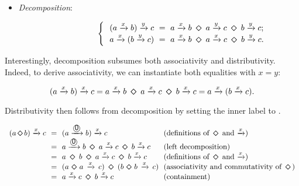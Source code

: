 \documentclass[crc,english]{programming}
\newcommand{\zero}{\raisebox{-0.2mm}{\textcircled{\textsf{0}}}\xspace}
\newcommand{\dia}{\,\text{\raisebox{-0.3mm}{\Large $\diamond$}}\,}
\begin{document}
\vspace{5mm}
\begin{itemize}
    \item \emph{Decomposition}:

          \vspace{-16.3mm}\begin{equation*}
            \hspace{22.5mm}\begin{cases}
                \ \ (a \xrightarrow{x} b) \xrightarrow{y} c\ =\ a \xrightarrow{x} b\ \dia\ a \xrightarrow{y} c\ \dia\ b \xrightarrow{y} c;\\
                \ \ a \xrightarrow{x} (b \xrightarrow{y} c)\ =\ a \xrightarrow{x} b\ \dia\ a \xrightarrow{x} c\ \dia\ b \xrightarrow{y} c.\\
            \end{cases}
          \end{equation*}
\end{itemize}

\noindent
Interestingly, decomposition subsumes both associativity and distributivity.
Indeed, to derive associativity, we can instantiate both equalities with
$x = y$:

\vspace{-5mm}
\begin{equation*}
(a \xrightarrow{x} b) \xrightarrow{x} c = a \xrightarrow{x} b\ \dia\ a \xrightarrow{x} c\ \dia\ b \xrightarrow{x} c = a \xrightarrow{x} (b \xrightarrow{x} c).
\end{equation*}
\vspace{-5mm}

\noindent
Distributivity then follows from decomposition by setting the inner label to
\zero.

\vspace{-5mm}
\begin{equation*}
\begin{array}{rcll}
(a \dia b) \xrightarrow{x} c &\!\!=\!\!& (a \xrightarrow{\zero} b) \xrightarrow{x} c &\!\!\text{(definitions of $\dia$ and $\xrightarrow{x}$)}\\
 &\!\!=\!\!& a \xrightarrow{\zero} b\ \dia\ a \xrightarrow{x} c\ \dia\ b \xrightarrow{x} c &\!\!\text{(left decomposition)}\\
 &\!\!=\!\!& a\ \dia\ b\ \dia\ a \xrightarrow{x} c\ \dia\ b \xrightarrow{x} c &\!\!\text{(definitions of $\dia$ and $\xrightarrow{x}$)}\\
 &\!\!=\!\!& (a\,\dia\,a\,\xrightarrow{x}\,c)\ \dia\ (b\,\dia\,b\,\xrightarrow{x}\,c) &\!\!\text{(associativity and commutativity of \dia)}\\
 &\!\!=\!\!& a \xrightarrow{x} c\ \dia\ b \xrightarrow{x} c &\!\!\text{(containment)}
\end{array}
\end{equation*}
\vspace{-3mm}
\end{document}
